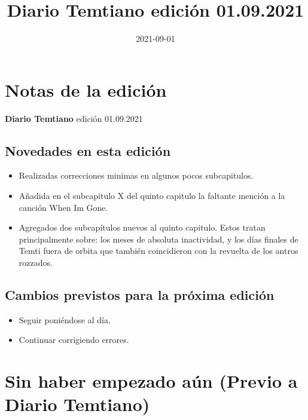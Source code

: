 \documentclass[
  spanish,
]{book}
\title{Diario Temtiano edición 01.09.2021}
\author{}
\date{\vspace{-2.5em}2021-09-01}
\providecommand{\tightlist}{%
  \setlength{\itemsep}{0pt}\setlength{\parskip}{0pt}}
\begin{document}
\maketitle

{
\setcounter{tocdepth}{1}
\tableofcontents
}
\hypertarget{notas-de-la-ediciuxf3n}{%
\chapter*{Notas de la edición}\label{notas-de-la-ediciuxf3n}}

\textbf{Diario Temtiano} edición 01.09.2021

\hypertarget{novedades-en-esta-ediciuxf3n}{%
\section*{Novedades en esta edición}\label{novedades-en-esta-ediciuxf3n}}

\begin{itemize}
\tightlist
\item
  Realizadas correcciones minimas en algunos pocos subcapitulos.
\item
  Añadida en el subcapitulo X del quinto capitulo la faltante mención a la canción When Im Gone.
\item
  Agregados dos subcapítulos nuevos al quinto capitulo. Estos tratan principalmente sobre: los meses de absoluta inactividad, y los días finales de Temti fuera de orbita que también coincidieron con la revuelta de los antros rozzados.
\end{itemize}

\hypertarget{cambios-previstos-para-la-pruxf3xima-ediciuxf3n}{%
\section*{Cambios previstos para la próxima edición}\label{cambios-previstos-para-la-pruxf3xima-ediciuxf3n}}

\begin{itemize}
\tightlist
\item
  Seguir poniéndose al día.
\item
  Continuar corrigiendo errores.
\end{itemize}

\hypertarget{sin-haber-empezado-auxfan-previo-a-diario-temtiano}{%
\chapter{Sin haber empezado aún (Previo a Diario Temtiano)}\label{sin-haber-empezado-auxfan-previo-a-diario-temtiano}}
\end{document}
